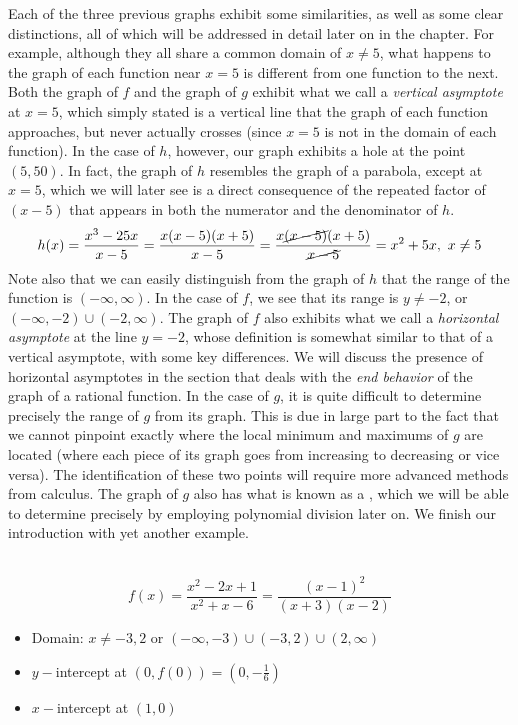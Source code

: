 Each of the three previous graphs exhibit some similarities, as well as some clear distinctions, all of which will be addressed in detail later on in the chapter.  For example, although they all share a common domain of $x\neq 5$, what happens to the graph of each function near $x=5$ is different from one function to the next.\pp
Both the graph of $f$ and the graph of $g$ exhibit what we call a \textit{vertical asymptote} at $x=5$, which simply stated is a vertical line that the graph of each function approaches, but never actually crosses (since $x=5$ is not in the domain of each function).  In the case of $h$, however, our graph exhibits a hole at the point $(5,50)$.  In fact, the graph of $h$ resembles the graph of a parabola, except at $x=5$, which we will later see is a direct consequence of the repeated factor of $(x-5)$ that appears in both the numerator and the denominator of $h$.
$$h(x)=\dfrac{x^3-25x}{x-5}=\dfrac{x(x-5)(x+5)}{x-5}=\dfrac{x\cancel{(x-5)}(x+5)}{\cancel{x-5}}=x^2+5x,~x\neq 5$$
Note also that we can easily distinguish from the graph of $h$ that the range of the function is $(-\infty,\infty)$.\pp
In the case of $f$, we see that its range is $y\neq -2$, or $(-\infty,-2)\cup(-2,\infty)$.  The graph of $f$ also exhibits what we call a \textit{horizontal asymptote} at the line $y=-2$, whose definition is somewhat similar to that of a vertical asymptote, with some key differences.  We will discuss the presence of horizontal asymptotes in the section that deals with the \textit{end behavior} of the graph of a rational function.\pp
In the case of $g$, it is quite difficult to determine precisely the range of $g$ from its graph.  This is due in large part to the fact that we cannot pinpoint exactly where the local minimum and maximums of $g$ are located (where each piece of its graph goes from increasing to decreasing or vice versa).  The identification of these two points will require more advanced methods from calculus.\pp
The graph of $g$ also has what is known as a , which we will be able to determine precisely by employing polynomial division later on.\pp
We finish our introduction with yet another example.
\newpage
\begin{example}~\\
$$f(x)=\dfrac{x^2-2x+1}{x^2+x-6}=\dfrac{(x-1)^2}{(x+3)(x-2)}$$
\begin{itemize}
	\item Domain: $x\neq -3,2$ or $(-\infty,-3)\cup(-3,2)\cup(2,\infty)$
	\item $y-$intercept at $(0,f(0))=(0,-\frac{1}{6})$
	\item $x-$intercept at $(1,0)$
\end{itemize}
\end{example}
